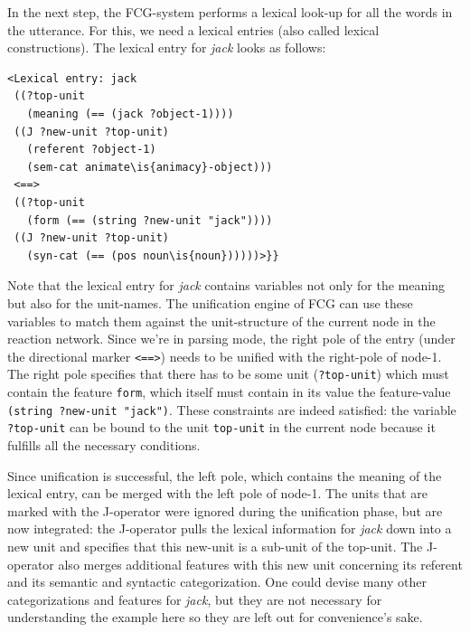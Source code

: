 In the next step, the FCG-system performs a lexical look-up for all the words in the utterance. For this, we need a lexical entries (also called lexical constructions). The lexical entry for {\em jack} looks as follows: 

\ea
\begin{lstlisting}
<Lexical entry: jack
 ((?top-unit
   (meaning (== (jack ?object-1))))
 ((J ?new-unit ?top-unit)
   (referent ?object-1)
   (sem-cat animate\is{animacy}-object)))
 <==>
 ((?top-unit
   (form (== (string ?new-unit "jack"))))
 ((J ?new-unit ?top-unit)
   (syn-cat (== (pos noun\is{noun})))))>}}
\end{lstlisting}
\z


Note that the lexical entry for {\em jack} contains variables not only for the meaning but also for the unit-names. The unification engine of FCG can use these variables to match them against the unit-structure of the current node in the reaction network. Since we're in parsing mode, the right pole of the entry (under the directional marker {\tt <==>}) needs to be unified with the right-pole of node-1. The right pole specifies that there has to be some unit ({\tt ?top-unit}) which must contain the feature {\tt form}, which itself must contain in its value the feature-value {\tt (string ?new-unit "jack")}. These constraints are indeed satisfied: the variable {\tt ?top-unit} can be bound to the unit {\tt top-unit} in the current node because it fulfills all the necessary conditions.

Since unification is successful, the left pole, which contains the meaning of the lexical entry, can be merged with the left pole of node-1. The units that are marked with the J-operator were ignored during the unification phase, but are now integrated: the J-operator pulls the lexical information for {\em jack} down into a new unit and specifies that this new-unit is a sub-unit of the top-unit. The J-operator also merges additional features with this new unit concerning its referent and its semantic and syntactic categorization. One could devise many other categorizations and features for {\em jack}, but they are not necessary for understanding the example here so they are left out for convenience's sake.

